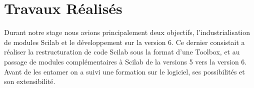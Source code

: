 \section*{Travaux Réalisés}

Durant notre stage nous avions principalement deux objectifs,
l’industrialisation de modules Scilab et le développement sur
la version 6.
Ce dernier consistait a réaliser la restructuration de code Scilab sous
la format d’une Toolbox, et au passage de modules complémentaires
à Scilab de la versions 5 vers la version 6.
Avant de les entamer on a suivi une formation sur le logiciel,
ses possibilités et son extensibilité.





